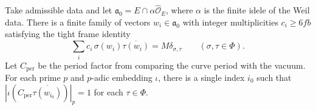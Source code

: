 \begin{lemma}
\label{lem:c-derivative-frame}
\emitthmsource
Take admissible data and let $\mathfrak a_0=E\cap\alpha\widehat{\mathcal O}_E$, where $\alpha$ is the finite idele of the Weil data. There is a finite family of vectors $w_i\in\mathfrak a_0$ with integer multiplicities $c_i\ge6fb$ satisfying the tight frame identity
\[
       \sum_i c_i\,\sigma(w_i)\overline{\tau(w_i)}
        =M\delta_{\sigma,\tau}
        \qquad(\sigma,\tau\in\Phi).
\]
Let $C_{\mathrm{per}}$ be the period factor from comparing the curve period with the vacuum. For each prime $p$ and $p$-adic embedding $\iota$, there is a single index $i_0$ such that $|\iota(C_{\mathrm{per}}\overline{\tau(w_{i_0})})|_p=1$ for each $\tau\in\Phi$.
\end{lemma}

